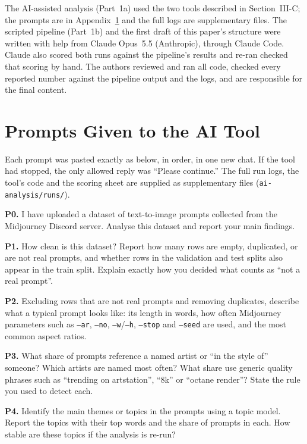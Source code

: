 \documentclass[conference]{IEEEtran}
\begin{document}
The AI-assisted analysis (Part~1a) used the two tools described in
Section~III-C; the prompts are in Appendix~\ref{app:prompts} and the full
logs are supplementary files. The scripted pipeline (Part~1b) and the first draft of this paper's structure
were written with help from Claude Opus~5.5 (Anthropic), through Claude
Code. Claude also scored both runs against the pipeline's results and re-ran
checked that scoring by hand. The authors reviewed and ran all code, checked every reported number against the
pipeline output and the logs, and are responsible for the final content.




\appendices

\section{Prompts Given to the AI Tool}
\label{app:prompts}
Each prompt was pasted exactly as below, in order, in one new chat. If the
tool had stopped, the only allowed reply was ``Please continue.'' The full
run logs, the tool's code and the scoring sheet are supplied as
supplementary files (\texttt{ai-analysis/runs/}).

\textbf{P0.} I have uploaded a dataset of text-to-image prompts collected
from the Midjourney Discord server. Analyse this dataset and report your
main findings.

\textbf{P1.} How clean is this dataset? Report how many rows are empty,
duplicated, or are not real prompts, and whether rows in the validation
and test splits also appear in the train split. Explain exactly how you
decided what counts as ``not a real prompt''.

\textbf{P2.} Excluding rows that are not real prompts and removing
duplicates, describe what a typical prompt looks like: its length in
words, how often Midjourney parameters such as \texttt{--ar},
\texttt{--no}, \texttt{--w}/\texttt{--h}, \texttt{--stop} and
\texttt{--seed} are used, and the most common aspect ratios.

\textbf{P3.} What share of prompts reference a named artist or ``in the
style of'' someone? Which artists are named most often? What share use
generic quality phrases such as ``trending on artstation'', ``8k'' or
``octane render''? State the rule you used to detect each.

\textbf{P4.} Identify the main themes or topics in the prompts using a
topic model. Report the topics with their top words and the share of
prompts in each. How stable are these topics if the analysis is re-run?
\end{document}
